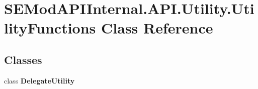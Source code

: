 \hypertarget{class_s_e_mod_a_p_i_internal_1_1_a_p_i_1_1_utility_1_1_utility_functions}{}\section{S\+E\+Mod\+A\+P\+I\+Internal.\+A\+P\+I.\+Utility.\+Utility\+Functions Class Reference}
\label{class_s_e_mod_a_p_i_internal_1_1_a_p_i_1_1_utility_1_1_utility_functions}
\subsection*{Classes}
\begin{DoxyCompactItemize}
\item 
class {\bfseries Delegate\+Utility}
\end{DoxyCompactItemize}
